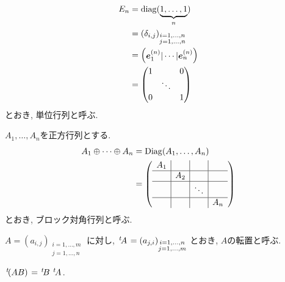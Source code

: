 \begin{align*}
  E_n&=
  \operatorname{diag}(\underbrace{1,\ldots,1}_{n})\\
  &=(\delta_{i,j})_{\substack{i=1,\ldots,n\\j=1,\ldots,n}}\\
  &=\begin{pmatrix}\boldsymbol{e}^{(n)}_1|\cdots|\boldsymbol{e}^{(n)}_n\end{pmatrix}\\
  &=\begin{pmatrix}
  1&&0\\
  &\ddots&\\
  0&&1
  \end{pmatrix}
\end{align*}
とおき,
単位行列と呼ぶ.



$A_1,\ldots,A_n$を正方行列とする.
\begin{align*}
  A_1\oplus\cdots\oplus A_n
  &=\operatorname{Diag}(A_1,\ldots,A_n)\\
  &=
  \left(
  \begin{array}{c|c|c|c}
    A_1&&&\\\hline
    &A_2&&\\\hline
    &&\ddots&\\\hline
    &&&A_n
    \end{array}
  \right)
\end{align*}
とおき,
ブロック対角行列と呼ぶ.


$A=(a_{i,j})_{\substack{i=1,\ldots,m\\j=1,\ldots,n}}$
に対し,
$\left.^{t}\!A\right.=(a_{j,i})_{\substack{i=1,\ldots,n\\j=1,\ldots,m}}$
とおき,
$A$の転置と呼ぶ.
\begin{remark}
  $\left.^{t}\!(AB)\right.=\left.^{t}\!B\right.\left.^{t}\!A\right.$.
\end{remark}

